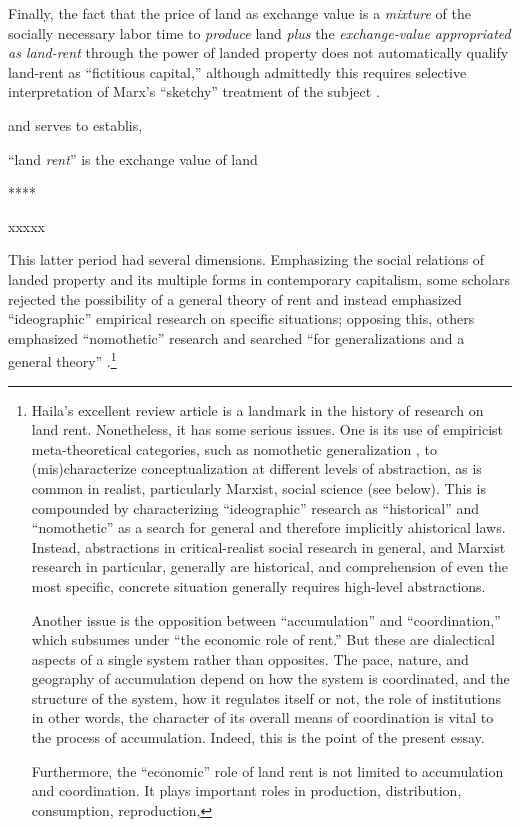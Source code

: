 Finally, the fact that the price of land as exchange value is a \emph{mixture}
of the socially necessary labor time to \emph{produce} land \emph{plus}
the \emph{exchange-value appropriated as land-rent} through the power
of landed property does not automatically qualify land-rent as ``fictitious
capital,'' although admittedly this requires selective interpretation
of Marx's ``sketchy'' treatment of the subject \citep[xv]{harvey2006thelimits}. 

\citet[97]{harvey2006thelimits}

and serves to establis, 

``land \emph{rent}'' is the exchange value of land

{*}{*}{*}{*}

xxxxx

This latter period had several dimensions. Emphasizing the social
relations of landed property and its multiple forms in contemporary
capitalism, some scholars rejected the possibility of a general theory
of rent and instead emphasized ``ideographic'' empirical research
on specific situations; opposing this, others emphasized ``nomothetic''
research and searched ``for generalizations and a general theory''
\citep[293]{haila1990thetheory}.\footnote{Haila's excellent review article is a landmark in the history of research
on land rent. Nonetheless, it has some serious issues. One is its
use of empiricist meta-theoretical categories, such as nomothetic
generalization \citep{willer1973systematic}, to (mis)characterize
conceptualization at different levels of abstraction, as is common
in realist, particularly Marxist, social science (see below). This
is compounded by characterizing ``ideographic'' research as ``historical''
and ``nomothetic'' as a search for general \textendash{} and therefore
implicitly ahistorical \textendash{} laws. Instead, abstractions in
critical-realist social research in general, and Marxist research
in particular, generally are historical, and comprehension of even
the most specific, concrete situation generally requires high-level
abstractions.

Another issue is the opposition between ``accumulation'' and ``coordination,''
which \citep[276]{haila1990thetheory} subsumes under ``the economic
role of rent.'' But these are dialectical aspects of a single system
rather than opposites. The pace, nature, and geography of accumulation
depend on how the system is coordinated, and the structure of the
system, how it regulates itself or not, the role of institutions \textendash{}
in other words, the character of its overall means of coordination
\textendash{} is vital to the process of accumulation. Indeed, this
is the point of the present essay.

Furthermore, the ``economic'' role of land rent is not limited to
accumulation and coordination. It plays important roles in production,
distribution, consumption, reproduction, }

